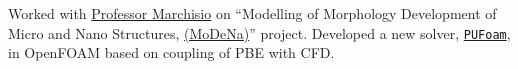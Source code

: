 \documentclass[10pt,a4]{article}
\newcommand{\quotes}[1]{``#1''}
\begin{document}
\begin{small}
\begin{list}{}{}
\item Worked with \href{http://bit.ly/2CYF9sp}{Professor Marchisio} on \quotes{Modelling of Morphology Development of Micro and Nano Structures, \href{https://github.com/karimimp/MoDeNa}{(MoDeNa)}} project. Developed a new solver, \href{http://www.sciencedirect.com/science/article/pii/S0010465517300978}{\texttt{PUFoam}}, in OpenFOAM based on coupling of PBE with CFD.
\end{list}


\end{small}
\end{document}
